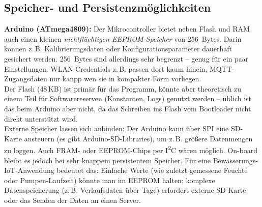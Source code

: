 \subsection{Speicher- und Persistenzmöglichkeiten}

\textbf{Arduino (ATmega4809):} Der Mikrocontroller bietet neben Flash und RAM auch einen kleinen \textit{nichtflüchtigen EEPROM-Speicher} von 256~Bytes. \autocite{atmega_datasheet} Darin können z.\,B. Kalibrierungsdaten oder Konfigurationsparameter dauerhaft gesichert werden. 256~Bytes sind allerdings sehr begrenzt – genug für ein paar Einstellungen. WLAN-Credentials z.\,B. passen dort kaum hinein, MQTT-Zugangsdaten nur kanpp wen sie in kompakter Form vorliegen. 
\\
Der Flash (48\,KB) ist primär für das Programm, könnte aber theoretisch zu einem Teil für Softwarereserven (Konstanten, Logs) genutzt werden – üblich ist das beim Arduino aber nicht, da das Schreiben ins Flash vom Bootloader nicht direkt unterstützt wird. 
\\
Externe Speicher lassen sich anbinden: Der Arduino kann über SPI eine SD-Karte ansteuern (es gibt Arduino-SD-Libraries), um z.\,B. größere Datenmengen zu loggen. Auch FRAM- oder EEPROM-Chips per I\textsuperscript{2}C wären möglich. On-board bleibt es jedoch bei sehr knappem persistentem Speicher. Für eine Bewässerungs-IoT-Anwendung bedeutet das: Einfache Werte (wie zuletzt gemessene Feuchte oder Pumpen-Laufzeit) könnte man im EEPROM halten; komplexe Datenspeicherung (z.\,B. Verlaufsdaten über Tage) erfordert externe SD-Karte oder das Senden der Daten an einen Server.


\vspace{5mm}

